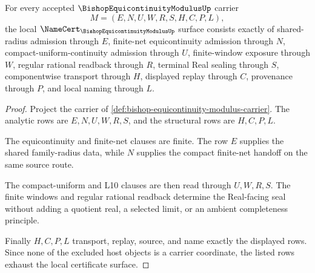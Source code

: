 \begin{theorem}
\label{thm:bishop-equicontinuity-modulus-namecert-obligations}
For every accepted $\BishopEquicontinuityModulusUp$ carrier
$$
M=(E,N,U,W,R,S,H,C,P,L),
$$
the local $\NameCert_{\BishopEquicontinuityModulusUp}$ surface consists exactly of shared-radius admission through $E$, finite-net equicontinuity admission through $N$, compact-uniform-continuity admission through $U$, finite-window exposure through $W$, regular rational readback through $R$, terminal Real sealing through $S$, componentwise transport through $H$, displayed replay through $C$, provenance through $P$, and local naming through $L$.
\end{theorem}
\begin{proof}
Project the carrier of \autoref{def:bishop-equicontinuity-modulus-carrier}. The analytic rows are $E,N,U,W,R,S$, and the structural rows are $H,C,P,L$.

The equicontinuity and finite-net clauses are finite. The row $E$ supplies the shared family-radius data, while $N$ supplies the compact finite-net handoff on the same source route.

The compact-uniform and L10 clauses are then read through $U,W,R,S$. The finite windows and regular rational readback determine the Real-facing seal without adding a quotient real, a selected limit, or an ambient completeness principle.

Finally $H,C,P,L$ transport, replay, source, and name exactly the displayed rows. Since none of the excluded host objects is a carrier coordinate, the listed rows exhaust the local certificate surface.
\end{proof}

